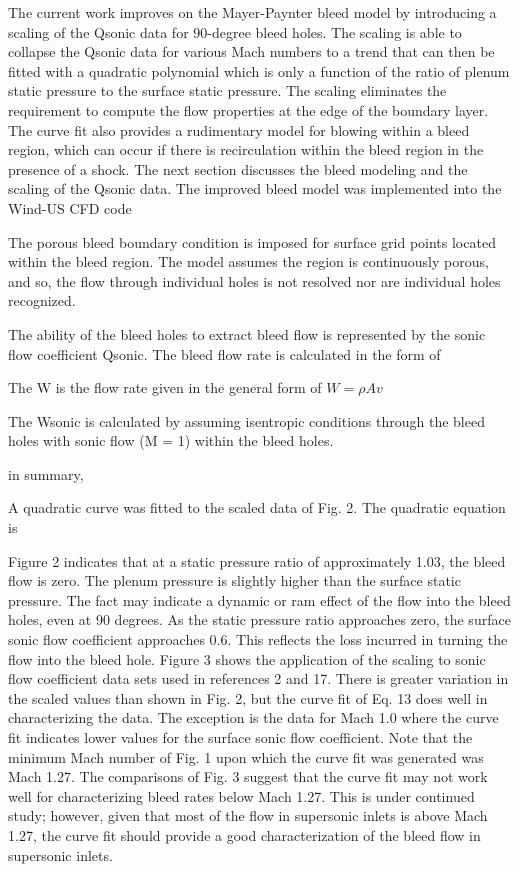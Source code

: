 \documentclass{article}
\begin{document}
The current work improves on the Mayer-Paynter bleed model by introducing a scaling of the Qsonic data for 90-degree bleed holes. The scaling is able to collapse the Qsonic data for various Mach numbers to a trend that can then be fitted with a quadratic polynomial which is only a function of the ratio of plenum static pressure to the surface static pressure. The scaling eliminates the requirement to compute the flow properties at the edge of the boundary layer. The curve fit also provides a rudimentary model for blowing within a bleed region, which can occur if there is recirculation within the bleed region in the presence of a shock. The next section discusses the bleed modeling and the scaling of the Qsonic data. The improved bleed model was implemented into the Wind-US CFD code

The porous bleed boundary condition is imposed for surface grid points located within the bleed region. The model assumes the region is continuously porous, and so, the flow through individual holes is not resolved nor are individual holes recognized.

The ability of the bleed holes to extract bleed flow is represented by the sonic flow coefficient Qsonic. The bleed flow rate is calculated in the form of

The W is the flow rate given in the general form of $ W = \rho A v $

The Wsonic is calculated by assuming isentropic conditions through the bleed holes with sonic flow (M = 1) within the bleed holes.

in summary, 


A quadratic curve was fitted to the scaled data of Fig. 2. The quadratic equation is

Figure 2 indicates that at a static pressure ratio of approximately 1.03, the bleed flow is zero. The plenum pressure is slightly higher than the surface static pressure. The fact may indicate a dynamic or ram effect of the flow into the bleed holes, even at 90 degrees. As the static pressure ratio approaches zero, the surface sonic flow coefficient approaches 0.6. This reflects the loss incurred in turning the flow into the bleed hole. Figure 3 shows the application of the scaling to sonic flow coefficient data sets used in references 2 and 17. There is greater variation in the scaled values than shown in Fig. 2, but the curve fit of Eq. 13 does well in characterizing the data. The exception is the data for Mach 1.0 where the curve fit indicates lower values for the surface sonic flow coefficient. Note that the minimum Mach number of Fig. 1 upon which the curve fit was generated was Mach 1.27. The comparisons of Fig. 3 suggest that the curve fit may not work well for characterizing bleed rates below Mach 1.27. This is under continued study; however, given that most of the flow in supersonic inlets is above Mach 1.27, the curve fit should provide a good characterization of the bleed flow in supersonic inlets.
\end{document}
